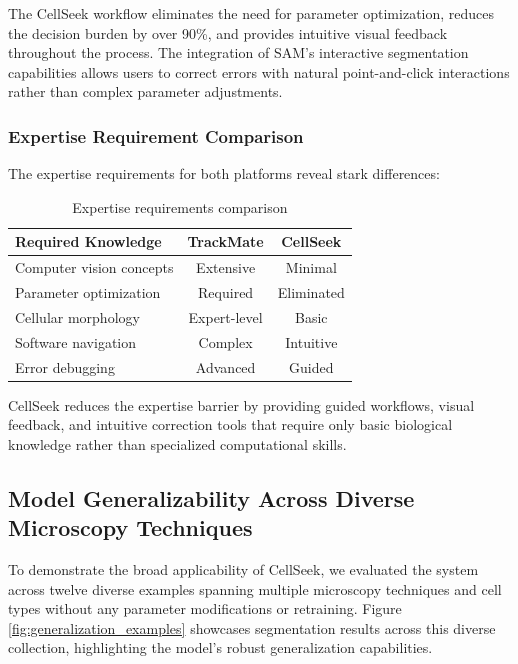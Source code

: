 \documentclass[../cellseek_paper.tex]{subfiles}
\begin{document}
The CellSeek workflow eliminates the need for parameter optimization, reduces the decision burden by over 90\%, and provides intuitive visual feedback throughout the process. The integration of SAM's interactive segmentation capabilities allows users to correct errors with natural point-and-click interactions rather than complex parameter adjustments.

\subsubsection{Expertise Requirement Comparison}

The expertise requirements for both platforms reveal stark differences:

\begin{table}[H]
  \centering
  \caption{Expertise requirements comparison}
  \begin{tabular}{lcc}
    \toprule
    \textbf{Required Knowledge} & \textbf{TrackMate} & \textbf{CellSeek} \\
    \midrule
    Computer vision concepts    & Extensive          & Minimal           \\
    Parameter optimization      & Required           & Eliminated        \\
    Cellular morphology         & Expert-level       & Basic             \\
    Software navigation         & Complex            & Intuitive         \\
    Error debugging             & Advanced           & Guided            \\
    \bottomrule
  \end{tabular}
\end{table}

CellSeek reduces the expertise barrier by providing guided workflows, visual feedback, and intuitive correction tools that require only basic biological knowledge rather than specialized computational skills.

\subsection{Model Generalizability Across Diverse Microscopy Techniques}

To demonstrate the broad applicability of CellSeek, we evaluated the system across twelve diverse examples spanning multiple microscopy techniques and cell types without any parameter modifications or retraining. Figure \ref{fig:generalization_examples} showcases segmentation results across this diverse collection, highlighting the model's robust generalization capabilities.
\end{document}
